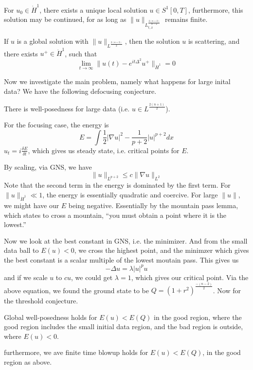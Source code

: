 \begin{theorem}
    For $u_0\in\dot{H}^1$, there exists a unique local solution $u\in S^1[0,T]$, furthermore, this solution may be continued, for as long as $\|u\|_{L_{t,x}^\frac{2(n+2)}{n-2}}$ remains finite.
\end{theorem}

\begin{theorem}
    If $u$ is a global solution with $\|u\|_{L^\frac{2(n+2)}{2}}$, then the solution $u$ is scattering, and there exists $u^+\in \dot{H}^1$, such that 
    \begin{equation*}
        \lim_{t\to\infty}\|u(t)-e^{it\Delta^2}u^+\|_{\dot{H}^1}=0
    \end{equation*}
\end{theorem}

Now we investigate the main problem, namely what happens for large inital data? We have the following defocusing conjecture.
\begin{proposition}[Conjecture]
    There is well-posedness for large data (i.e. $u\in L^\frac{2(n+1)}{2}$).
\end{proposition}
For the focusing case, the energy is
\begin{equation*}
    E=\int\frac{1}{2}|\nabla u|^2-\frac{1}{p+2}|u|^{p+2}dx
\end{equation*}
$u_t=i\frac{\delta E}{\delta t}$, which gives us steady state, i.e. critical points for $E$.

By scaling, via GNS, we have
\begin{equation*}
    \|u\|_{L^{p+2}}\leq c\|\nabla u\|_{L^2}
\end{equation*}
Note that the second term in the energy is dominated by the first term. For $\|u\|_{\dot{H}^1}\ll 1$, the energy is essentially quadratic and coercive. For large $\|u\|$, we might have our $E$ being negative. Essentially by the mountain pass lemma, which states to cross a mountain, ``you must obtain a point where it is the lowest.''

Now we look at the best constant in GNS, i.e. the minimizer. And from the small data ball to $E(u)<0$, we cross the highest point, and the minimzer which gives the best constant is a scalar multiple of the lowest moutain pass. This gives us
\begin{equation*}
    -\Delta u=\lambda |u|^p u
\end{equation*}
and if we scale $u$ to $cu$, we could get $\lambda=1$, which gives our critical point. Via the above equation, we found the ground state to be $Q=(1+r^2)^\frac{-(n-2)}{2}$. Now for the threshold conjecture.
\begin{proposition}[Conjecture]
    Global well-posedness holds for $E(u)<E(Q)$ in the good region, where the good region includes the small initial data region, and the bad region is outside, where $E(u)<0$.

    furthermore, we ave finite time blowup holds for $E(u)<E(Q)$, in the good region as above.
\end{proposition}

